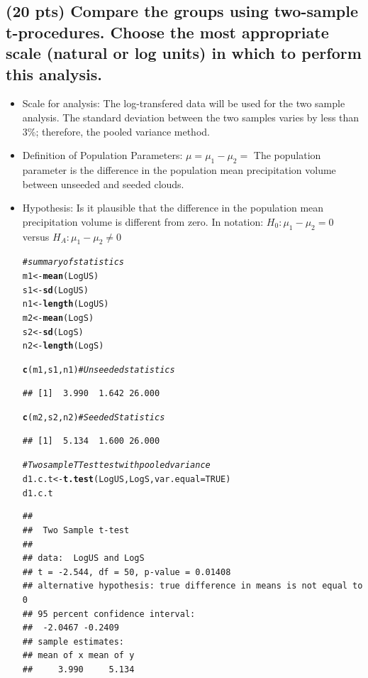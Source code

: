 \documentclass{article}\usepackage[]{graphicx}\usepackage[]{color}
\makeatletter
\newcommand{\hlnum}[1]{\textcolor[rgb]{0.686,0.059,0.569}{#1}}%
\newcommand{\hlcom}[1]{\textcolor[rgb]{0.678,0.584,0.686}{\textit{#1}}}%
\newcommand{\hlstd}[1]{\textcolor[rgb]{0.345,0.345,0.345}{#1}}%
\newcommand{\hlkwb}[1]{\textcolor[rgb]{0.69,0.353,0.396}{#1}}%
\newcommand{\hlkwc}[1]{\textcolor[rgb]{0.333,0.667,0.333}{#1}}%
\newcommand{\hlkwd}[1]{\textcolor[rgb]{0.737,0.353,0.396}{\textbf{#1}}}%
\newenvironment{kframe}{%
 \def\at@end@of@kframe{}%
 \ifinner\ifhmode%
  \def\at@end@of@kframe{\end{minipage}}%
  \begin{minipage}{\columnwidth}%
 \fi\fi%
 \def\FrameCommand##1{\hskip\@totalleftmargin \hskip-\fboxsep
 \colorbox{shadecolor}{##1}\hskip-\fboxsep
     \hskip-\linewidth \hskip-\@totalleftmargin \hskip\columnwidth}%
 \MakeFramed {\advance\hsize-\width
   \@totalleftmargin\z@ \linewidth\hsize
   \@setminipage}}%
 {\par\unskip\endMakeFramed%
 \at@end@of@kframe}
\newenvironment{knitrout}{}{} %
\makeatother
\begin{document}

\subsection{(20 pts) Compare the groups using two-sample t-procedures. Choose the most appropriate scale
(natural or log units) in which to perform this analysis.}

\begin{itemize}
  \item Scale for analysis:  The log-transfered data will be used for the  two sample analysis.  The standard deviation between the two samples varies by less than 3\%; therefore, the pooled variance method.
  \item Definition of Population Parameters: $\mu = \mu_1 - \mu_2 = $  The population parameter is  the difference in the population mean precipitation volume between unseeded and seeded clouds.
  \item Hypothesis:  Is it plausible that the difference in the population mean precipitation volume is different from zero.  In notation:  $H_0: \mu_1 - \mu_2 = 0$ versus $H_A: \mu_1 - \mu_2 \ne 0$

\begin{knitrout}
\color{fgcolor}\begin{kframe}
\begin{alltt}
\hlcom{# summary of statistics}
\hlstd{m1} \hlkwb{<-} \hlkwd{mean}\hlstd{(LogUS)}
\hlstd{s1} \hlkwb{<-} \hlkwd{sd}\hlstd{(LogUS)}
\hlstd{n1} \hlkwb{<-} \hlkwd{length}\hlstd{(LogUS)}
\hlstd{m2} \hlkwb{<-} \hlkwd{mean}\hlstd{(LogS)}
\hlstd{s2} \hlkwb{<-} \hlkwd{sd}\hlstd{(LogS)}
\hlstd{n2} \hlkwb{<-} \hlkwd{length}\hlstd{(LogS)}

\hlkwd{c}\hlstd{(m1, s1, n1)} \hlcom{#Unseeded statistics}
\end{alltt}
\begin{verbatim}
## [1]  3.990  1.642 26.000
\end{verbatim}
\begin{alltt}
\hlkwd{c}\hlstd{(m2, s2, n2)} \hlcom{#Seeded Statistics}
\end{alltt}
\begin{verbatim}
## [1]  5.134  1.600 26.000
\end{verbatim}
\begin{alltt}
\hlcom{# Two sample T Test test with pooled variance}
\hlstd{d1.c.t} \hlkwb{<-} \hlkwd{t.test}\hlstd{(LogUS, LogS,} \hlkwc{var.equal} \hlstd{=} \hlnum{TRUE}\hlstd{)}
\hlstd{d1.c.t}
\end{alltt}
\begin{verbatim}
## 
## 	Two Sample t-test
## 
## data:  LogUS and LogS
## t = -2.544, df = 50, p-value = 0.01408
## alternative hypothesis: true difference in means is not equal to 0
## 95 percent confidence interval:
##  -2.0467 -0.2409
## sample estimates:
## mean of x mean of y 
##     3.990     5.134
\end{verbatim}
\end{kframe}
\end{knitrout}


\end{itemize}
\end{document}
